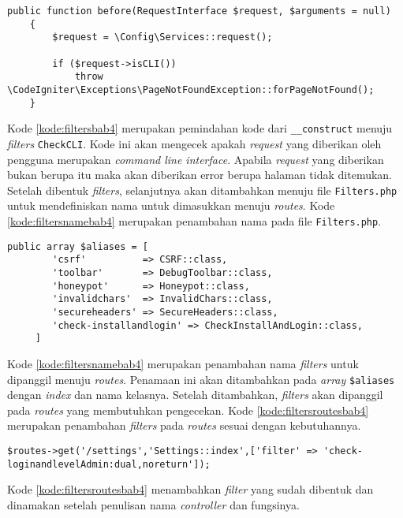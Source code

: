 \begin{lstlisting}[caption=Pemindahan kode pada \textit{Filters}, label=kode:filtersbab4]
	public function before(RequestInterface $request, $arguments = null)
    {   
        $request = \Config\Services::request();

        if ($request->isCLI())
            throw \CodeIgniter\Exceptions\PageNotFoundException::forPageNotFound();
    }
\end{lstlisting}
Kode \ref{kode:filtersbab4} merupakan pemindahan kode dari \texttt{\_\_construct} menuju \textit{filters} \texttt{CheckCLI}. Kode ini akan mengecek apakah \textit{request} yang diberikan oleh pengguna merupakan \textit{command line interface}. Apabila \textit{request} yang diberikan bukan berupa itu maka akan diberikan error berupa halaman tidak ditemukan. Setelah dibentuk \textit{filters}, selanjutnya akan ditambahkan menuju file \texttt{Filters.php} untuk mendefiniskan nama untuk dimasukkan menuju \textit{routes}. Kode \ref{kode:filtersnamebab4} merupakan penambahan nama pada file \texttt{Filters.php}.

\begin{lstlisting}[caption=Penambahan nama \textit{filters} untuk didefinisikan menuju \textit{routes}, label=kode:filtersnamebab4]
	public array $aliases = [
        'csrf'          => CSRF::class,
        'toolbar'       => DebugToolbar::class,
        'honeypot'      => Honeypot::class,
        'invalidchars'  => InvalidChars::class,
        'secureheaders' => SecureHeaders::class,
        'check-installandlogin' => CheckInstallAndLogin::class,
     ]
\end{lstlisting}

Kode \ref{kode:filtersnamebab4} merupakan penambahan nama \textit{filters} untuk dipanggil menuju \textit{routes}. Penamaan ini akan ditambahkan pada \textit{array} \verb|$aliases| dengan \textit{index} dan nama kelasnya. Setelah ditambahkan, \textit{filters} akan dipanggil pada \textit{routes} yang membutuhkan pengecekan. Kode \ref{kode:filtersroutesbab4} merupakan penambahan \textit{filters} pada \textit{routes} sesuai dengan kebutuhannya.

\begin{lstlisting}[caption=Penambahan \textit{filter} pada \textit{routes}, label=kode:filtersroutesbab4]
	$routes->get('/settings','Settings::index',['filter' => 'check-loginandlevelAdmin:dual,noreturn']);
\end{lstlisting}

Kode \ref{kode:filtersroutesbab4} menambahkan \textit{filter} yang sudah dibentuk dan dinamakan setelah penulisan nama \textit{controller} dan fungsinya. 

